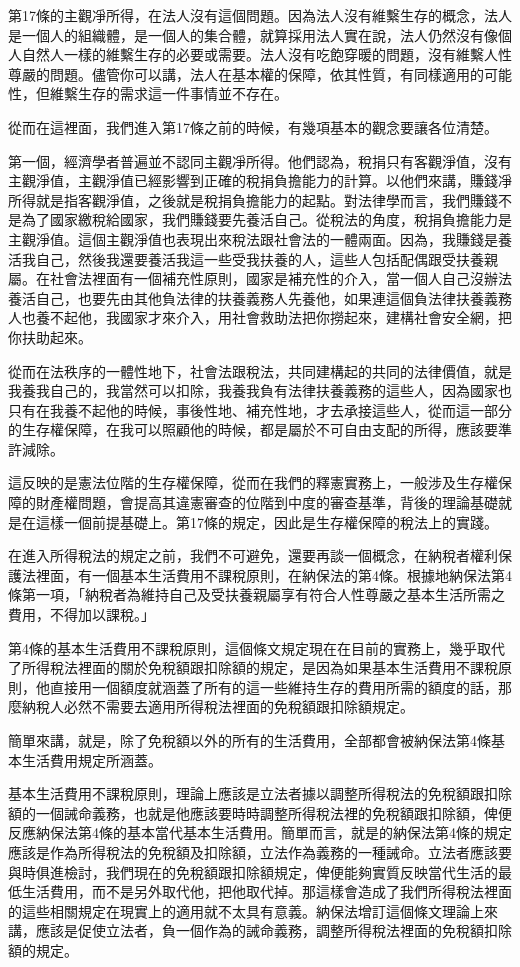 \documentclass[oneside,sub3section]{ctexbook}
\begin{document}
第17條的主觀凈所得，在法人沒有這個問題。因為法人沒有維繫生存的概念，法人是一個人的組織體，是一個人的集合體，就算採用法人實在說，法人仍然沒有像個人自然人一樣的維繫生存的必要或需要。法人沒有吃飽穿暖的問題，沒有維繫人性尊嚴的問題。儘管你可以講，法人在基本權的保障，依其性質，有同樣適用的可能性，但維繫生存的需求這一件事情並不存在。

從而在這裡面，我們進入第17條之前的時候，有幾項基本的觀念要讓各位清楚。

第一個，經濟學者普遍並不認同主觀凈所得。他們認為，稅捐只有客觀淨值，沒有主觀淨值，主觀淨值已經影響到正確的稅捐負擔能力的計算。以他們來講，賺錢凈所得就是指客觀淨值，之後就是稅捐負擔能力的起點。對法律學而言，我們賺錢不是為了國家繳稅給國家，我們賺錢要先養活自己。從稅法的角度，稅捐負擔能力是主觀淨值。這個主觀淨值也表現出來稅法跟社會法的一體兩面。因為，我賺錢是養活我自己，然後我還要養活我這一些受我扶養的人，這些人包括配偶跟受扶養親屬。在社會法裡面有一個補充性原則，國家是補充性的介入，當一個人自己沒辦法養活自己，也要先由其他負法律的扶養義務人先養他，如果連這個負法律扶養義務人也養不起他，我國家才來介入，用社會救助法把你撈起來，建構社會安全網，把你扶助起來。

從而在法秩序的一體性地下，社會法跟稅法，共同建構起的共同的法律價值，就是我養我自己的，我當然可以扣除，我養我負有法律扶養義務的這些人，因為國家也只有在我養不起他的時候，事後性地、補充性地，才去承接這些人，從而這一部分的生存權保障，在我可以照顧他的時候，都是屬於不可自由支配的所得，應該要準許減除。

這反映的是憲法位階的生存權保障，從而在我們的釋憲實務上，一般涉及生存權保障的財產權問題，會提高其違憲審查的位階到中度的審查基準，背後的理論基礎就是在這樣一個前提基礎上。第17條的規定，因此是生存權保障的稅法上的實踐。

在進入所得稅法的規定之前，我們不可避免，還要再談一個概念，在納稅者權利保護法裡面，有一個基本生活費用不課稅原則，在納保法的第4條。根據地納保法第4條第一項，「納稅者為維持自己及受扶養親屬享有符合人性尊嚴之基本生活所需之費用，不得加以課稅。」

第4條的基本生活費用不課稅原則，這個條文規定現在在目前的實務上，幾乎取代了所得稅法裡面的關於免稅額跟扣除額的規定，是因為如果基本生活費用不課稅原則，他直接用一個額度就涵蓋了所有的這一些維持生存的費用所需的額度的話，那麼納稅人必然不需要去適用所得稅法裡面的免稅額跟扣除額規定。

簡單來講，就是，除了免稅額以外的所有的生活費用，全部都會被納保法第4條基本生活費用規定所涵蓋。

基本生活費用不課稅原則，理論上應該是立法者據以調整所得稅法的免稅額跟扣除額的一個誡命義務，也就是他應該要時時調整所得稅法裡的免稅額跟扣除額，俾便反應納保法第4條的基本當代基本生活費用。簡單而言，就是的納保法第4條的規定應該是作為所得稅法的免稅額及扣除額，立法作為義務的一種誡命。立法者應該要與時俱進檢討，我們現在的免稅額跟扣除額規定，俾便能夠實質反映當代生活的最低生活費用，而不是另外取代他，把他取代掉。那這樣會造成了我們所得稅法裡面的這些相關規定在現實上的適用就不太具有意義。納保法增訂這個條文理論上來講，應該是促使立法者，負一個作為的誡命義務，調整所得稅法裡面的免稅額扣除額的規定。
\end{document}
